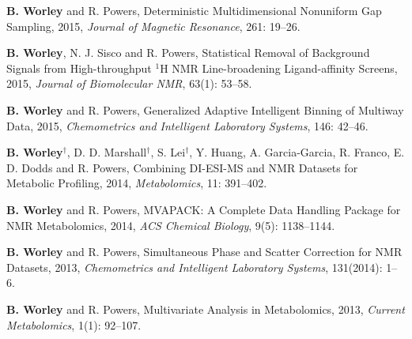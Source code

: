 \documentclass[letterpaper]{article}
\renewenvironment{itemize}{
  \begin{list}{}{
    \setlength{\leftmargin}{1.5em}
  }
}{
  \end{list}
}
\begin{document}
\begin{itemize}
\item \textbf{B. Worley} and R. Powers,
 Deterministic Multidimensional Nonuniform Gap Sampling, 2015,
 {\it Journal of Magnetic Resonance}, 261: 19--26.
\end{itemize}

\begin{itemize}
\item \textbf{B. Worley}, N. J. Sisco and R. Powers,
 Statistical Removal of Background Signals from High-throughput $^1$H NMR
 Line-broadening Ligand-affinity Screens, 2015,
 {\it Journal of Biomolecular NMR}, 63(1): 53--58.
\end{itemize}

\begin{itemize}
\item \textbf{B. Worley} and R. Powers,
 Generalized Adaptive Intelligent Binning of Multiway Data, 2015,
 {\it Chemometrics and Intelligent Laboratory Systems}, 146: 42--46.
\end{itemize}

\begin{itemize}
\item \textbf{B. Worley}$^\dagger$, D. D. Marshall$^\dagger$,
 S. Lei$^\dagger$, Y. Huang, A. Garcia-Garcia, R. Franco,
 E. D. Dodds and R. Powers, Combining DI-ESI-MS and NMR Datasets for
 Metabolic Profiling, 2014,
 {\it Metabolomics}, 11: 391--402.
\end{itemize}

\begin{itemize}
\item \textbf{B. Worley} and R. Powers,
 MVAPACK: A Complete Data Handling Package for NMR Metabolomics, 2014,
 {\it ACS Chemical Biology}, 9(5): 1138--1144.
\end{itemize}

\begin{itemize}
\item \textbf{B. Worley} and R. Powers,
 Simultaneous Phase and Scatter Correction for NMR Datasets, 2013,
 {\it Chemometrics and Intelligent Laboratory Systems}, 131(2014): 1--6.
\end{itemize}

\begin{itemize}
\item \textbf{B. Worley} and R. Powers,
 Multivariate Analysis in Metabolomics, 2013,
 {\it Current Metabolomics}, 1(1): 92--107.
\end{itemize}
\end{document}
